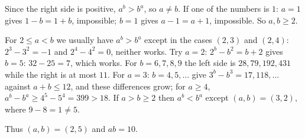 Since the right side is positive, $a^b>b^a$, so $a\ne b$. If one of the numbers is $1$: $a=1$ gives $1-b=1+b$, impossible; $b=1$ gives $a-1=a+1$, impossible. So $a,b\ge2$.

For $2\le a<b$ we usually have $a^b>b^a$ except in the cases $(2,3)$ and $(2,4)$: $2^3-3^2=-1$ and $2^4-4^2=0$, neither works. Try $a=2$: $2^b-b^2=b+2$ gives $b=5$: $32-25=7$, which works. For $b=6,7,8,9$ the left side is $28,79,192,431$ while the right is at most $11$.
For $a=3$: $b=4,5,\dots$ give $3^b-b^3=17,118,\dots$ against $a+b\le12$, and these differences grow; for $a\ge4$, $a^b-b^a\ge 4^5-5^4=399>18$.
If $a>b\ge2$ then $a^b<b^a$ except $(a,b)=(3,2)$, where $9-8=1\ne5$.

Thus $(a,b)=(2,5)$ and $ab=\boxed{10}$.

